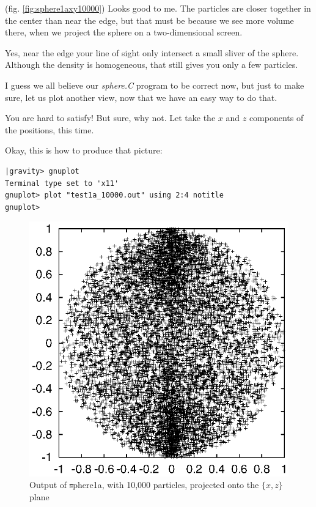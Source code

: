 \abc

\carol
(fig. \ref{fig:sphere1axy10000}) Looks good to me.  The particles are
closer together in the center than near the edge, but that must be
because we see more volume there, when we project the sphere on a
two-dimensional screen.

\alice
Yes, near the edge your line of sight only intersect a small sliver of
the sphere.  Although the density is homogeneous, that still gives you
only a few particles.

\bob
I guess we all believe our {\sl sphere.C} program to be correct now,
but just to make sure, let us plot another view, now that we have an
easy way to do that.

\carol
You are hard to satisfy!  But sure, why not.  Let take the $x$ and $z$
components of the positions, this time.

\alice
Okay, this is how to produce that picture:

\cba

\begin{small}
\begin{verbatim}
|gravity> gnuplot
Terminal type set to 'x11'
gnuplot> plot "test1a_10000.out" using 2:4 notitle
gnuplot>
\end{verbatim}
\end{small}

\begin{figure}[htb]
\centering
\includegraphics[width=4.5in]{chap9/test1axz10000.ps}
\caption[xz plot of {\st sphere1a} output]
{Output of {\st sphere1a}, with 10,000 particles, projected onto the
$\{x,z\}$ plane}
\label{fig:sphere1axz10000}
\end{figure}

